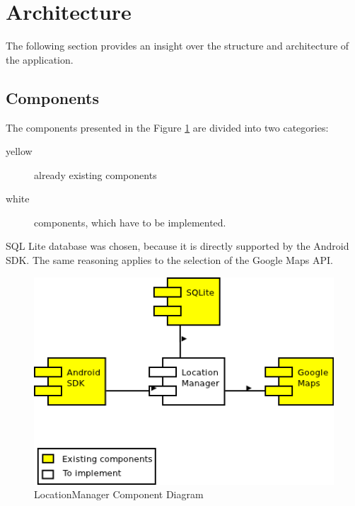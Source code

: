 \section{Architecture}
The following section provides an insight over the structure and architecture
of the application.
\subsection{Components}
The components presented in the Figure \ref{componentDiagram} are divided into
two categories:
\begin{description}
  \item[yellow] already existing components
  \item[white]  components, which have to be implemented.
\end{description}
SQL Lite database was chosen, because it is directly supported by the Android
SDK. The same reasoning applies to the selection of the Google Maps API.
 \begin{figure}[h]
  \caption{LocationManager Component Diagram}
  \label{componentDiagram}
  \center
  	\includegraphics[scale=0.75]{../resources/ComponentDiagram.png}
\end{figure}

